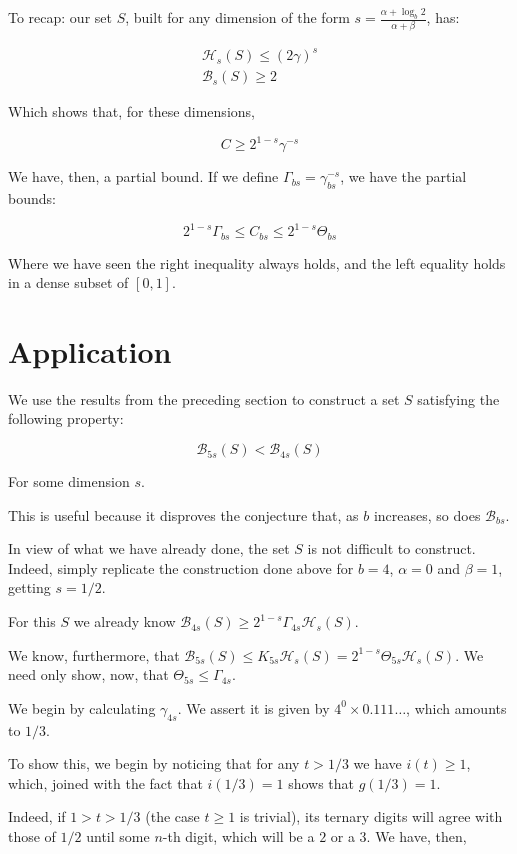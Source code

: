 \documentclass[11pt, reqno]{amsart}
\newcommand{\HH}{\mathcal{H}}
\newcommand{\BB}{\mathcal{B}}
\begin{document}
To recap: our set $S$, built for any dimension of the form $s = \frac{\alpha + \log_b 2}{\alpha + \beta}$, has:

\begin{gather*}
\HH_s(S) \leq (2\gamma)^s\\
\BB_s(S) \geq 2
\end{gather*}

Which shows that, for these dimensions,

\[C \geq 2^{1-s} \gamma^{-s}\]

We have, then, a partial bound. If we define $\Gamma_{bs} = \gamma_{bs}^{-s}$, we have the partial bounds:

\[ 2^{1-s} \Gamma_{bs} \leq C_{bs} \leq 2^{1-s} \Theta_{bs} \]

Where we have seen the right inequality always holds, and the left equality holds in a dense subset of $\left[0, 1 \right]$.

\section{Application}\label{secfinal}

We use the results from the preceding section to construct a set $S$ satisfying the following property:

\[ \BB_{5s}(S) < \BB_{4s}(S) \]

For some dimension $s$.

This is useful because it disproves the conjecture that, as $b$ increases, so does $\BB_{bs}$.

In view of what we have already done, the set $S$ is not difficult to construct. Indeed, simply replicate the construction done above for $b = 4$, $\alpha = 0$  and $\beta = 1$, getting $s = 1/2$.

For this $S$ we already know $\BB_{4s}(S) \geq 2^{1-s} \Gamma_{4s} \HH_s(S)$.

We know, furthermore, that $\BB_{5s}(S) \leq K_{5s} \HH_s(S) = 2^{1-s} \Theta_{5s} \HH_s(S)$. We need only show, now, that  $\Theta_{5s} \leq \Gamma_{4s}$.

We begin by calculating $\gamma_{4s}$. We assert it is given by $4^0 \times 0.111\dots$, which amounts to $1/3$.

To show this, we begin by noticing that for any $t > 1/3$ we have $i(t) \geq 1$, which, joined with the fact that $i(1/3) = 1$ shows that $g(1/3) = 1$.

Indeed, if $1 > t > 1/3$ (the case $t \geq 1$ is trivial), its ternary digits will agree with those of $1/2$ until some $n$-th digit, which will be a $2$ or a $3$. We have, then,
\end{document}

